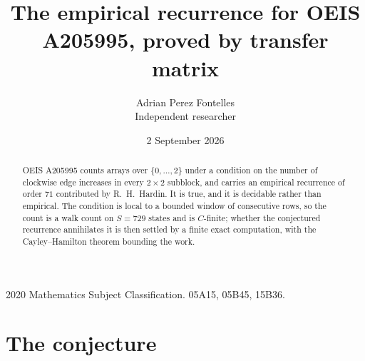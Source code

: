 \documentclass[11pt,a4paper]{article}
\title{The empirical recurrence for OEIS A205995, proved by transfer matrix}
\author{Adrian Perez Fontelles\\ \small Independent researcher}
\date{2 September 2026}
\theoremstyle{plain}
\theoremstyle{definition}
\begin{document}
\maketitle

\begin{abstract}
OEIS A205995 counts arrays over $\{0,\dots,2\}$ under a condition on the number of clockwise edge increases
in every $2\times2$ subblock, and carries an empirical recurrence of order $71$ contributed by
R.~H.~Hardin. It is true, and it is decidable rather than empirical. The condition is local to
a bounded window of consecutive rows, so the count is a walk count on $S=729$ states and is
$C$-finite; whether the conjectured recurrence annihilates it is then settled by a finite exact
computation, with the Cayley--Hamilton theorem bounding the work.
\end{abstract}

\noindent\small 2020 Mathematics Subject Classification. 05A15, 05B45, 15B36.\normalsize

\section{The conjecture}
\end{document}
